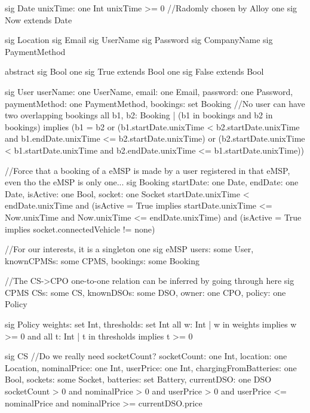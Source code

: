 \documentclass[11pt]{article}
\def\code#1{{\texttt{#1}}}
\begin{document}

\begin{ffcode}
    sig Date {
	unixTime: one Int
    } {
    	unixTime >= 0
    }
    //Radomly chosen by Alloy
    one sig Now extends Date {}
    
    sig Location {}
    sig Email {}
    sig UserName {}
    sig Password {}
    sig CompanyName {}
    sig PaymentMethod {}
    
    abstract sig Bool {}
    one sig True extends Bool {}
    one sig False extends Bool {}
    
    sig User {
    	userName: one UserName,
    	email: one Email,
    	password: one Password,
    	paymentMethod: one PaymentMethod,
    	bookings: set Booking
    } {
    	//No user can have two overlapping bookings
    	all b1, b2: Booking | (b1 in bookings and b2 in bookings)
    	implies
    	(b1 = b2 or (b1.startDate.unixTime < b2.startDate.unixTime and b1.endDate.unixTime <= b2.startDate.unixTime) or
    	(b2.startDate.unixTime < b1.startDate.unixTime and b2.endDate.unixTime <= b1.startDate.unixTime))
    }
    
    //Force that a booking of a eMSP is made by a user registered in that eMSP, even tho the eMSP is only one...
    sig Booking {
    	startDate: one Date,
    	endDate: one Date,
    	isActive: one Bool,
    	socket: one Socket
    } {
    	startDate.unixTime < endDate.unixTime
    	and (isActive = True implies startDate.unixTime <= Now.unixTime and Now.unixTime <= endDate.unixTime)
    	and (isActive = True implies socket.connectedVehicle != none)
    }
    
    //For our interests, it is a singleton
    one sig eMSP {
    	users: some User,
    	knownCPMSs: some CPMS,
    	bookings: some Booking
    }
    
    //The CS->CPO one-to-one relation can be inferred by going through here
    sig CPMS {
    	CSs: some CS,
    	knownDSOs: some DSO,
    	owner: one CPO,
    	policy: one Policy
    }
    
    sig Policy {
    	weights: set Int,
    	thresholds: set Int
    } {
    	all w: Int | w in weights implies w >= 0
    	and all t: Int | t in thresholds implies t >= 0
    }
    
    sig CS {
    	//Do we really need socketCount?
    	socketCount: one Int,
    	location: one Location,
    	nominalPrice: one Int,
    	userPrice: one Int,
    	chargingFromBatteries: one Bool,
    	sockets: some Socket,
    	batteries: set Battery,
    	currentDSO: one DSO
    } {
    	socketCount > 0
    	and nominalPrice > 0
    	and userPrice > 0
    	and userPrice <= nominalPrice
    	and nominalPrice >= currentDSO.price
    }
    

\end{ffcode}
\end{document}
